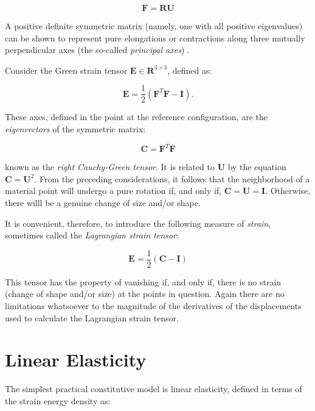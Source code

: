 \begin{equation}
\mathbf{F} =  \mathbf{R}\mathbf{U}
\end{equation}

A positive definite symmetric matrix (namely, one with all positive eigenvalues) can be shown to represent pure elongations or contractions along three 
mutually perpendicular axes (the so-called \textit{principal axes}) \cite{fung2001classical}.

Consider the Green strain tensor $\mathbf{E} \in \mathbf{R}^{3\times 3}$, defined as:

\begin{equation}
\mathbf{E} = \frac{1}{2}(\mathbf{F}^T\mathbf{F}-\mathbf{I}).
\end{equation}

These axes, defined in the point at the reference configuration, are the \textit{eigenvectors} of the symmetric matrix:

\begin{equation}
\mathbf{C} =  \mathbf{F}^T\mathbf{F}
\end{equation}

known as the \textit{right Cauchy-Green tensor}. It is related to $\textbf{U}$ by the equation $\mathbf{C}=\mathbf{U}^2$.
From the preceding considerations, it follows that the neighborhood of a material point will undergo a pure rotation if, 
and only if, $\mathbf{C}=\mathbf{U}=\mathbf{I}$. Otherwise, there willl be a genuine change of size and/or shape. 


It is convenient, therefore, to introduce the following measure of \textit{strain}, sometimes called the \textit{Lagrangian 
strain tensor}: 


\begin{equation}
\mathbf{E} = \frac{1}{2}(\mathbf{C} - \mathbf{I})
\end{equation}

This tensor has the property of vanishing if, and only if, there is no strain (change of shape and/or size) at the points in question.
Again there are no limitations whatsoever to the magnitude of the derivatives of the displacements used to calculate the Lagrangian
strain tensor. 


\section{Linear Elasticity}
The simplest practical constitutive model is linear elasticity, defined in terms of the strain energy density as:

